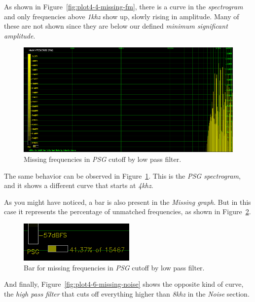 \documentclass[10pt,a4paper]{report}
\newcommand{\khz}[1]{\textit{\mbox{#1\acrshort{khz}}}}
\begin{document}
As shown in Figure~\ref{fig:plot4-4-missing-fm}, there is a curve in the \textit{spectrogram} and only frequencies above \khz{1} show up, slowly rising in amplitude. Many of these are not shown since they are below our defined \textit{minimum significant amplitude}.

\begin{figure}[H]
	\centering
	\includegraphics[width=1.0\linewidth]{images/interpretation/Plot4-5-Missing-PSG.png}
	\caption[Missing PSG]{Missing frequencies in \textit{PSG} cutoff by low pass filter.}
	\label{fig:plot4-5-missing-psg}
\end{figure}

The same behavior can be observed in Figure~\ref{fig:plot4-5-missing-psg}. This is the \textit{PSG spectrogram}, and it shows a different curve that starts at \khz{4}. 

As you might have noticed, a bar is also present in the \textit{Missing graph}. But in this case it represents the percentage of unmatched frequencies, as shown in Figure~\ref{fig:plot4-5-missing-psg-bars}.

\begin{figure}[H]
	\centering
	\includegraphics[width=0.4\linewidth]{images/interpretation/Plot4-5-Missing-PSG-bar.png}
	\caption[Missing PSG Bar]{Bar for missing frequencies in \textit{PSG} cutoff by low pass filter.}
	\label{fig:plot4-5-missing-psg-bars}
\end{figure}

And finally, Figure~\ref{fig:plot4-6-missing-noise} shows the opposite kind of curve, the \textit{high pass filter} that cuts off everything higher than \khz{8} in the \textit{Noise} section.
\end{document}
